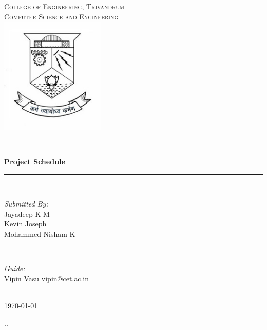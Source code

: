 \documentclass[12pt]{article}
\begin{document}
\nocite{*}
\begin{titlepage}
	\newcommand{\HRule}{\rule{\linewidth}{0.5mm}} %
	\center %
	 

	\textsc{\LARGE College of Engineering, Trivandrum}\\[1.5cm] %
	\textsc{\Large Computer Science and Engineering}\\[0.5cm] %
	\includegraphics[width=5cm]{images/logo.jpg} 

	\HRule \\[0.4cm]
	{ \huge \bfseries Project Schedule}\\[0.4cm] %
	\HRule \\[1.5cm]

	\begin{minipage}{0.4\textwidth}
	\begin{flushleft} \large
	\emph{Submitted By:}\\
	Jayadeep K M\\
	Kevin Joseph\\
	Mohammed Nisham K %

	\end{flushleft}
	\end{minipage}
	~
	\begin{minipage}{0.4\textwidth}
	\begin{flushright} \large
	\emph{Guide:} \\
	Vipin Vasu
	vipin@cet.ac.in %
	\end{flushright}
	\end{minipage}\\[2cm]

	{\large \today}\\[1cm] %

	\vfill %
\end{titlepage}
\color{white}..\\
\color{black}
\end{document}
